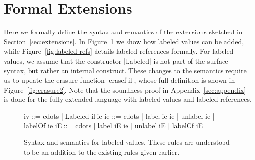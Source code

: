 \appendix


\section{Formal Extensions}
\label{sec:appendix-extensions}

Here we formally define the syntax and semantics of the extensions
sketched in Section~\ref{sec:extensions}.
In Figure~\ref{fig:labeled-vals} we show how labeled values can be added,
while Figure~\ref{fig:labeled-refs} details labeled references formally.
For labeled values, we assume that the constructor |Labeled| is not part
of the surface syntax, but rather an internal construct.
These changes to the semantics require us to update the erasure function
|erasef il|, whose full definition is shown in Figure~\ref{fig:erasure2}.
Note that the soundness proof in Appendix~\ref{sec:appendix}
is done for the fully extended language with labeled values and
labeled references.

\begin{figure}
  \begin{code}
    iv  ::= cdots | Labeled il ie
    ie  ::= cdots | label ie ie | unlabel ie | labelOf ie
    iE  ::= cdots | label iE ie | unlabel iE | labelOf iE
  \end{code}
  \caption{Syntax and semantics for labeled values.  These rules are
    understood to be an addition to the existing rules given earlier.}
  \label{fig:labeled-vals}
\end{figure}

